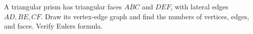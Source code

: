 A triangular prism has triangular faces $ABC$ and $DEF$, with lateral edges $AD,BE,CF$. Draw its vertex-edge graph and find the numbers of vertices, edges, and faces. Verify Euler\textquotesingle s formula.
